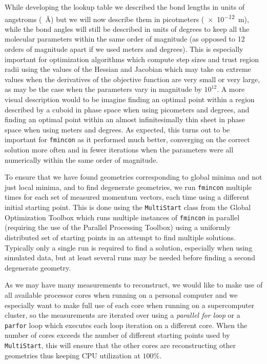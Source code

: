 While developing the lookup table we described the bond lengths in units of angstroms (\SI{}{\angstrom}) but we will now describe them in picotmeters (\SI{e-12}{\m}), while the bond angles will still be described in units of degrees to keep all the molecular parameters within the same order of magnitude (as opposed to 12 orders of magnitude apart if we used meters and degrees). This is especially important for optimization algorithms which compute step sizes and trust region radii using the values of the Hessian and Jacobian which may take on extreme values when the derivatives of the objective function are very small or very large, as may be the case when the parameters vary in magnitude by $10^{12}$. A more visual description would to be imagine finding an optimal point within a region described by a cuboid in phase space when using picometers and degrees, and finding an optimal point within an almost infinitesimally thin sheet in phase space when using meters and degrees. As expected, this turns out to be important for \texttt{fmincon} as it performed much better, converging on the correct solution more often and in fewer iterations when the parameters were all numerically within the same order of magnitude.

To ensure that we have found geometries corresponding to global minima and not just local minima, and to find degenerate geometries, we run \texttt{fmincon} multiple times for each set of measured momentum vectors, each time using a different initial starting point. This is done using the \texttt{MultiStart} class from the Global Optimization Toolbox which runs multiple instances of \texttt{fmincon} in parallel (requiring the use of the Parallel Processing Toolbox) using a uniformly distributed set of starting points in an attempt to find multiple solutions. Typically only a single run is required to find a solution, especially when using simulated data, but at least several runs may be needed before finding a second degenerate geometry.

As we may have many measurements to reconstruct, we would like to make use of all available processor cores when running on a personal computer and we especially want to make full use of each core when running on a supercomputer cluster, so the measurements are iterated over using a \emph{parallel for loop} or a \texttt{parfor} loop which executes each loop iteration on a different core. When the number of cores exceeds the number of different starting points used by \texttt{MultiStart}, this will ensure that the other cores are reconstructing other geometries thus keeping CPU utilization at $100\%$.

